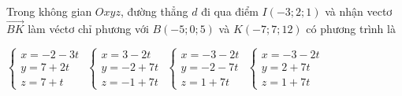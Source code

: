 \documentclass[12pt,a4paper]{article}
\begin{document}
\begin{ex}
 Trong không gian ${Oxyz}$, đường thẳng ${d}$ đi qua điểm ${I(-3;2;1)}$ và nhận vectơ $\overrightarrow{BK}$ làm véctơ chỉ phương với $B(-5;0;5)$ và $K(-7;7;12)$ có phương trình là
 
\choice
{ $\left\{ \begin{array}{l}x = -2-3t\\ y = 7+2t\\z = 7+t\end{array} \right.$ }
   { $\left\{ \begin{array}{l}x = 3-2t\\ y = -2+7t\\z = -1+7t\end{array} \right.$ }
     { $\left\{ \begin{array}{l}x = -3-2t\\ y = -2-7t\\z = 1+7t\end{array} \right.$ }
    { \True $\left\{ \begin{array}{l}x = -3-2t\\ y = 2+7t\\z = 1+7t\end{array} \right.$ }
\end{ex}
\end{document}
